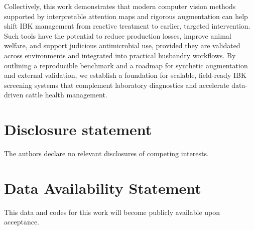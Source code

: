 \documentclass[preprint,12pt,authoryear]{elsarticle}
\begin{document}
Collectively, this work demonstrates that modern computer vision methods supported by interpretable attention maps and rigorous augmentation can help shift IBK management from reactive treatment to earlier, targeted intervention. Such tools have the potential to reduce production losses, improve animal welfare, and support judicious antimicrobial use, provided they are validated across environments and integrated into practical husbandry workflows. By outlining a reproducible benchmark and a roadmap for synthetic augmentation and external validation, we establish a foundation for scalable, field-ready IBK screening systems that complement laboratory diagnostics and accelerate data-driven cattle health management.

\section{Disclosure statement}
\label{disclosure-statement}

The authors declare no relevant disclosures of competing interests.



\section{Data Availability Statement}
\label{data-availability-statement}

This data and codes for this work will become publicly available upon acceptance.

 
  
 
\end{document}
